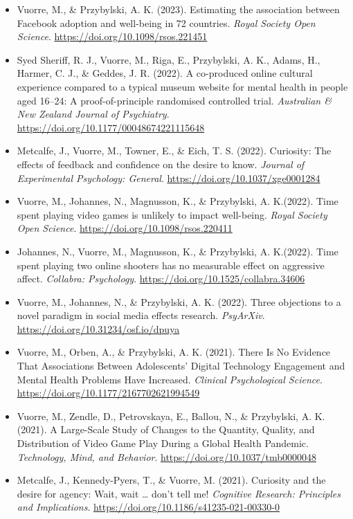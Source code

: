 \documentclass[12pt, a4paper]{article}
\newcommand{\years}[1]{\marginnote{\scriptsize #1}}
\begin{document}
\begin{itemize}
  \item Vuorre, M., \& Przybylski, A. K. (2023). Estimating the association between Facebook adoption and well-being in 72 countries. \emph{Royal Society Open Science}. \url{https://doi.org/10.1098/rsos.221451}
  \item \years{2022} Syed Sheriff, R. J., Vuorre, M., Riga, E., Przybylski, A. K., Adams, H., Harmer, C. J., \& Geddes, J. R. (2022). A co-produced online cultural experience compared to a typical museum website for mental health in people aged 16–24: A proof-of-principle randomised controlled trial. \emph{Australian \& New Zealand Journal of Psychiatry}. \url{https://doi.org/10.1177/00048674221115648}
  \item Metcalfe, J., Vuorre, M., Towner, E., \& Eich, T. S. (2022). Curiosity: The effects of feedback and confidence on the desire to know. \emph{Journal of Experimental Psychology: General}. \url{https://doi.org/10.1037/xge0001284}
  \item Vuorre, M.\footnotemark[1], Johannes, N.\footnotemark[1], Magnusson, K., \& Przybylski, A. K.\footnotemark[1] (2022). Time spent playing video games is unlikely to impact well-being. \emph{Royal Society Open Science}. \url{https://doi.org/10.1098/rsos.220411}
  \item Johannes, N.\footnotemark[1], Vuorre, M.\footnotemark[1], Magnusson, K., \& Przybylski, A. K.\footnotemark[1] (2022). Time spent playing two online shooters has no measurable effect on aggressive affect. \emph{Collabra: Psychology}. \url{https://doi.org/10.1525/collabra.34606}
  \item Vuorre, M., Johannes, N., \& Przybylski, A. K. (2022). Three objections to a novel paradigm in social media effects research. \emph{PsyArXiv}. \url{https://doi.org/10.31234/osf.io/dpuya}
  \item \years{2021} Vuorre, M., Orben, A., \& Przybylski, A. K. (2021). There Is No Evidence That Associations Between Adolescents’ Digital Technology Engagement and Mental Health Problems Have Increased. \emph{Clinical Psychological Science}. \\ \url{https://doi.org/10.1177/2167702621994549}
  \item Vuorre, M., Zendle, D., Petrovskaya, E., Ballou, N., \& Przybylski, A. K. (2021). A Large-Scale Study of Changes to the Quantity, Quality, and Distribution of Video Game Play During a Global Health Pandemic. \emph{Technology, Mind, and Behavior}. \url{https://doi.org/10.1037/tmb0000048}
  \item Metcalfe, J., Kennedy-Pyers, T., \& Vuorre, M. (2021). Curiosity and the desire for agency: Wait, wait … don’t tell me! \emph{Cognitive Research: Principles and Implications}. \url{https://doi.org/10.1186/s41235-021-00330-0}

\end{itemize}
\end{document}
